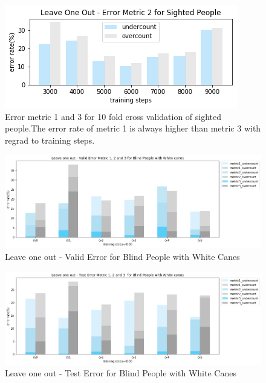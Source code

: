 \documentclass[11pt]{article}
\begin{document}
{\begin{figure}[ht]
\centering
\includegraphics[scale=0.55]{error_metric_2_na_step}
\caption{Error metric 1 and 3 for 10 fold cross validation of sighted people.The error rate of metric 1 is always higher than metric 3 with regrad to training steps.}
\label{fig:error_metric_2_na_step}
\end{figure}


\begin{figure}[ht]
\centering
\includegraphics[scale=0.5]{error_metric_wc_10fold_valid4000}
\caption{Leave one out - Valid Error for Blind People with White Canes}
\label{fig:error_metric_wc_10fold_valid4000}
\end{figure}


\begin{figure}[ht]
\centering
\includegraphics[scale=0.5]{error_metric_wc_10fold_test4000}
\caption{Leave one out - Test Error for Blind People with White Canes}
\label{fig:error_metric_wc_10fold_test4000}
\end{figure}

}
\end{document}
